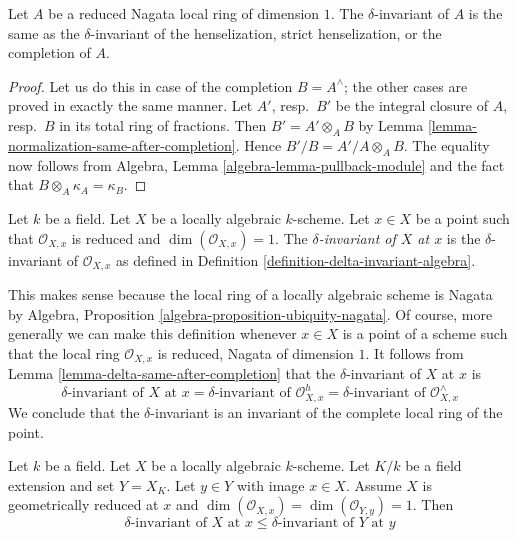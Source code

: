 \begin{lemma}
\label{lemma-delta-same-after-completion}
Let $A$ be a reduced Nagata local ring of dimension $1$.
The $\delta$-invariant of $A$ is the same as the
$\delta$-invariant of the henselization, strict henselization,
or the completion of $A$.
\end{lemma}

\begin{proof}
Let us do this in case of the completion $B = A^\wedge$;
the other cases are proved in exactly the same manner.
Let $A'$, resp.\ $B'$ be the integral closure of $A$, resp.\ $B$
in its total ring of fractions.
Then $B' = A' \otimes_A B$ by
Lemma \ref{lemma-normalization-same-after-completion}.
Hence $B'/B = A'/A \otimes_A B$.
The equality now follows from
Algebra, Lemma \ref{algebra-lemma-pullback-module}
and the fact that $B \otimes_A \kappa_A = \kappa_B$.
\end{proof}

\begin{definition}
\label{definition-delta-invariant}
Let $k$ be a field. Let $X$ be a locally algebraic $k$-scheme.
Let $x \in X$ be a point such that $\mathcal{O}_{X, x}$
is reduced and $\dim(\mathcal{O}_{X, x}) = 1$.
The {\it $\delta$-invariant of $X$ at $x$} is the
$\delta$-invariant of $\mathcal{O}_{X, x}$ as defined in
Definition \ref{definition-delta-invariant-algebra}.
\end{definition}

\noindent
This makes sense because the local ring of a locally
algebraic scheme is Nagata by
Algebra, Proposition \ref{algebra-proposition-ubiquity-nagata}.
Of course, more generally we can make this definition
whenever $x \in X$ is a point of a scheme such that
the local ring $\mathcal{O}_{X, x}$ is reduced, Nagata of dimension $1$.
It follows from Lemma \ref{lemma-delta-same-after-completion}
that the $\delta$-invariant of $X$ at $x$ is
$$
\delta\text{-invariant of }X\text{ at }x =
\delta\text{-invariant of }\mathcal{O}_{X, x}^h =
\delta\text{-invariant of }\mathcal{O}_{X, x}^\wedge
$$
We conclude that the $\delta$-invariant is an invariant
of the complete local ring of the point.

\begin{lemma}
\label{lemma-delta-invariant-and-change-of-fields}
Let $k$ be a field. Let $X$ be a locally algebraic $k$-scheme.
Let $K/k$ be a field extension and set $Y = X_K$.
Let $y \in Y$ with image $x \in X$.
Assume $X$ is geometrically reduced at $x$ and
$\dim(\mathcal{O}_{X, x}) = \dim(\mathcal{O}_{Y, y}) = 1$.
Then
$$
\delta\text{-invariant of }X\text{ at }x \leq
\delta\text{-invariant of }Y\text{ at }y
$$
\end{lemma}

